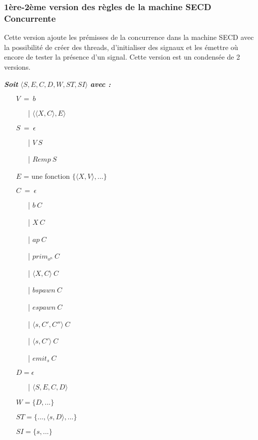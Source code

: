 \documentclass[10pt,a4paper]{article}
\begin{document}
			\subsubsection{1ère-2ème version des règles de la machine SECD Concurrente}\label{SECDConc1-2}
				\smallbreak
				Cette version ajoute les prémisses de la concurrence dans la machine SECD avec la possibilité de créer des threads, d'initialiser des signaux et les émettre où encore de tester la présence d'un signal. Cette version est un condensée de 2 versions.
				\bigbreak
					
				\textbf{\textit{Soit}} $\langle S,E,C,D,W,ST,SI\rangle$ \textbf{\textit{avec :}}
					
					
				\begin{itemize}
					\item[] $V~=~b$
					\begin{itemize}
						\item[|] $\langle\langle X,C\rangle,E\rangle$
					\end{itemize}
					\item[] $S~=~\epsilon$ 
					\begin{itemize}
						\item[|] $V~S$ 
						\item[|] $Remp~S$
					\end{itemize}
					\item[] $E$ = une fonction $\{\langle X,V\rangle,...\}$
					\item[] $C~=~\epsilon$ 
					\begin{itemize}
						\item[|] $b~C$
						\item[|] $X~C$
						\item[|] $ap~C$
						\item[|] $prim_{o^{n}}~C$  
						\item[|] $\langle X,C\rangle~C$
						\item[|] $bspawn~C$ 
						\item[|] $espawn~C$
						\item[|] $\langle s,C',C''\rangle~C$
						\item[|] $\langle s,C'\rangle~C$ 
						\item[|] $emit_{s}~C$ 
					\end{itemize}
					\item[] $D = \epsilon$
					\begin{itemize}
						\item[|] $\langle S,E,C,D\rangle$ 
					\end{itemize}
					\item[] $W = \{D,...\}$
					\item[] $ST = \{...,\langle s,D\rangle,...\}$
					\item[] $SI = \{ s,...\}$
				\end{itemize}
				\bigbreak
				\bigbreak
					
\end{document}
